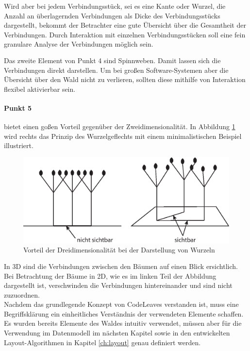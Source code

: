 Wird aber bei jedem Verbindungsstück, sei es eine Kante oder Wurzel, die Anzahl an überlagernden Verbindungen als Dicke des Verbindungsstücks dargestellt, bekommt der Betrachter eine gute Übersicht über die Gesamtheit der Verbindungen. Durch Interaktion mit einzelnen Verbindungsstücken soll eine fein granulare Analyse der Verbindungen möglich sein.

Das zweite Element von Punkt 4 sind Spinnweben. Damit lassen sich die Verbindungen direkt darstellen. Um bei großen Software-Systemen aber die Übersicht über den Wald nicht zu verlieren, sollten diese mithilfe von Interaktion flexibel aktivierbar sein.

\paragraph{Punkt 5} bietet einen goßen Vorteil gegenüber der Zweidimensionalität. In Abbildung \ref{fig:3d-advantage} wird rechts das Prinzip des Wurzelgeflechts mit einem minimalistischen Beispiel illustriert.

\begin{figure}[htb]
  \includegraphics[width=.8\textwidth]{figures/3d-advantage}
  \caption{Vorteil der Dreidimensionalität bei der Darstellung von Wurzeln}
  \label{fig:3d-advantage}
\end{figure}

In 3D sind die Verbindungen zwischen den Bäumen auf einen Blick ersichtlich. Bei Betrachtung der Bäume in 2D, wie es im linken Teil der Abbildung dargestellt ist, verschwinden die Verbindungen hintereinander und sind nicht zuzuordnen.\\

Nachdem das grundlegende Konzept von CodeLeaves verstanden ist, muss eine Begriffsklärung ein einheitliches Verständnis der verwendeten Elemente schaffen. Es wurden bereits Elemente des Waldes intuitiv verwendet, müssen aber für die Verwendung im Datenmodell im nächsten Kapitel sowie in den entwickelten Layout-Algorithmen in Kapitel \ref{ch:layout} genau definiert werden.

